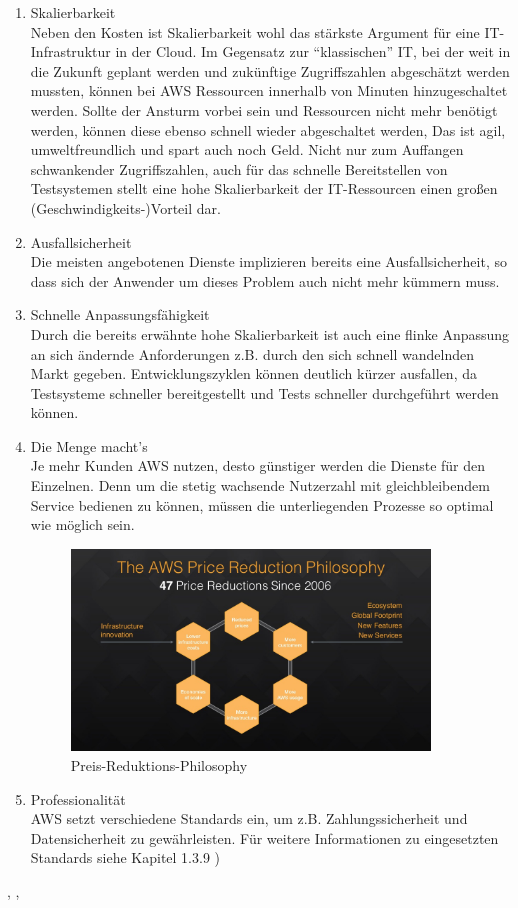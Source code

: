 {\begin{enumerate}
  \item Skalierbarkeit
  \\ Neben den Kosten ist Skalierbarkeit wohl das stärkste Argument für eine IT-Infrastruktur in der Cloud. Im Gegensatz zur "`klassischen"' IT, bei der weit in die Zukunft geplant werden und zukünftige Zugriffszahlen abgeschätzt werden mussten, können bei AWS Ressourcen innerhalb von Minuten hinzugeschaltet werden. Sollte der Ansturm vorbei sein und Ressourcen nicht mehr benötigt werden, können diese ebenso schnell wieder abgeschaltet werden, Das ist agil, umweltfreundlich und spart auch noch Geld. Nicht nur zum Auffangen schwankender Zugriffszahlen, auch für das schnelle Bereitstellen von Testsystemen stellt eine hohe Skalierbarkeit der IT-Ressourcen einen großen (Geschwindigkeits-)Vorteil dar.
  \item Ausfallsicherheit
  \\ Die meisten angebotenen Dienste implizieren bereits eine Ausfallsicherheit, so dass sich der Anwender um dieses Problem auch nicht mehr kümmern muss.
  \item Schnelle Anpassungsfähigkeit
  \\ Durch die bereits erwähnte hohe Skalierbarkeit ist auch eine flinke Anpassung an sich ändernde Anforderungen z.B. durch den sich schnell wandelnden Markt gegeben. Entwicklungszyklen können deutlich kürzer ausfallen, da Testsysteme schneller bereitgestellt und Tests schneller durchgeführt werden können.
  \item Die Menge macht's
  \\ Je mehr Kunden AWS nutzen, desto günstiger werden die Dienste für den Einzelnen. Denn um die stetig wachsende Nutzerzahl mit gleichbleibendem Service bedienen zu können, müssen die unterliegenden Prozesse so optimal wie möglich sein.
  \begin{figure}[!ht]
    \centering
    \includegraphics[width=0.9\textwidth]{images/price-reduction.jpg}
    \caption{Preis-Reduktions-Philosophy \cite{aws:insider}}
  \end{figure}
  \item Professionalität
  \\ AWS setzt verschiedene Standards ein, um z.B. Zahlungssicherheit und Datensicherheit zu gewährleisten. Für weitere Informationen zu eingesetzten Standards siehe Kapitel 1.3.9 \cite{wittig:awsinaction})
\end{enumerate} \cite{aws:insider}, \cite{wittig:awsinaction}, \cite{vliet:programmingec2}


}
